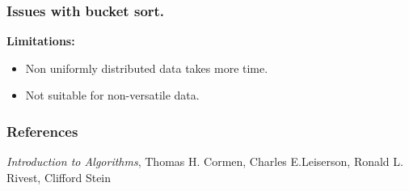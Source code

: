 \documentclass[pdf]{beamer}
\begin{document}
\begin{frame}
	\frametitle{Issues with bucket sort.}
	\textbf{Limitations:}
	\begin{itemize}
		\pause
		\item Non uniformly distributed data takes more time.
		\pause
		\item Not suitable for non-versatile data.
	\end{itemize}
\end{frame}

\begin{frame}
	\frametitle{References}
	\begin{thebibliography}{}
		\bibitem{}\emph{Introduction to Algorithms}, Thomas H. Cormen, Charles E.Leiserson, Ronald L. Rivest, Clifford Stein
	\end{thebibliography}
\end{frame}
\end{document}
